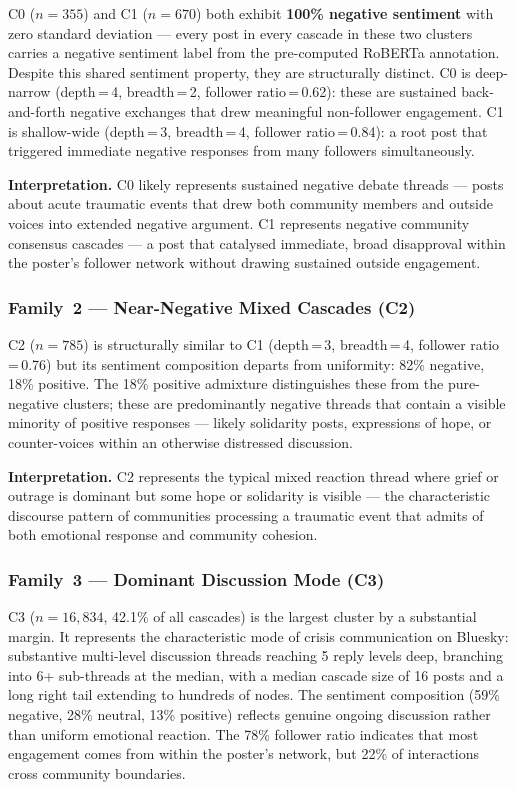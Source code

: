 \documentclass[12pt, a4paper]{article}
\begin{document}
C0 ($n\!=\!355$) and C1 ($n\!=\!670$) both exhibit \textbf{100\% negative sentiment} with zero standard deviation --- every post in every cascade in these two clusters carries a negative sentiment label from the pre-computed RoBERTa annotation. Despite this shared sentiment property, they are structurally distinct. C0 is deep-narrow (depth\,=\,4, breadth\,=\,2, follower ratio\,=\,0.62): these are sustained back-and-forth negative exchanges that drew meaningful non-follower engagement. C1 is shallow-wide (depth\,=\,3, breadth\,=\,4, follower ratio\,=\,0.84): a root post that triggered immediate negative responses from many followers simultaneously.

\textbf{Interpretation.} C0 likely represents sustained negative debate threads --- posts about acute traumatic events that drew both community members and outside voices into extended negative argument. C1 represents negative community consensus cascades --- a post that catalysed immediate, broad disapproval within the poster's follower network without drawing sustained outside engagement.

\subsubsection*{Family~2 --- Near-Negative Mixed Cascades (C2)}

C2 ($n\!=\!785$) is structurally similar to C1 (depth\,=\,3, breadth\,=\,4, follower ratio\,=\,0.76) but its sentiment composition departs from uniformity: 82\% negative, 18\% positive. The 18\% positive admixture distinguishes these from the pure-negative clusters; these are predominantly negative threads that contain a visible minority of positive responses --- likely solidarity posts, expressions of hope, or counter-voices within an otherwise distressed discussion.

\textbf{Interpretation.} C2 represents the typical mixed reaction thread where grief or outrage is dominant but some hope or solidarity is visible --- the characteristic discourse pattern of communities processing a traumatic event that admits of both emotional response and community cohesion.

\subsubsection*{Family~3 --- Dominant Discussion Mode (C3)}

C3 ($n\!=\!16{,}834$, 42.1\% of all cascades) is the largest cluster by a substantial margin. It represents the characteristic mode of crisis communication on Bluesky: substantive multi-level discussion threads reaching 5 reply levels deep, branching into 6+ sub-threads at the median, with a median cascade size of 16 posts and a long right tail extending to hundreds of nodes. The sentiment composition (59\% negative, 28\% neutral, 13\% positive) reflects genuine ongoing discussion rather than uniform emotional reaction. The 78\% follower ratio indicates that most engagement comes from within the poster's network, but 22\% of interactions cross community boundaries.
\end{document}
